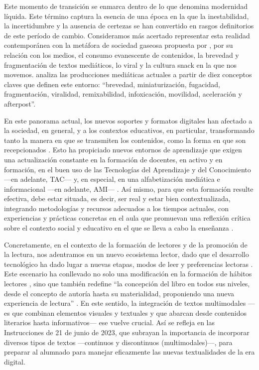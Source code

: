 \documentclass[spanish]{textolivre}
\begin{document}
Este momento de transición se enmarca dentro de lo que \textcite{bauman_modernidad_2004,bauman_acerca_2019} denomina modernidad líquida. Este término captura la esencia de una época en la que la inestabilidad, la incertidumbre y la ausencia de certezas se han convertido en rasgos definitorios de este período de cambio. Consideramos más acertado representar esta realidad contemporánea con la metáfora de sociedad gaseosa propuesta por \textcite{scolari_cultura_2021}, por su relación con los medios, el consumo evanescente de contenidos, la brevedad y fragmentación de textos mediáticos, lo viral y la cultura snack en la que nos movemos. \textcite[p. 157]{scolari_cultura_2021} analiza las producciones mediáticas actuales a partir de diez conceptos claves que definen este entorno: “brevedad, miniaturización, fugacidad, fragmentación, viralidad, remixabilidad, infoxicación, movilidad, aceleración y afterpost”.

En este panorama actual, los nuevos soportes y formatos digitales han afectado a la sociedad, en general, y a los contextos educativos, en particular, transformando tanto la manera en que se transmiten los contenidos, como la forma en que son recepcionados \cite{heredia_tecnicas_2019,tabernero_habitos_2020}. Esto ha propiciado nuevos entornos de aprendizaje que exigen una actualización constante en la formación de docentes, en activo y en formación, en el buen uso de las Tecnologías del Aprendizaje y del Conocimiento —en adelante, TAC— \cite{alvarez_tac_2017} y, en especial, en una alfabetización mediática e informacional —en adelante, AMI— \cite{santiago_del_pino_consulta_2019}. Así mismo, para que esta formación resulte efectiva, debe estar situada, es decir, ser real y estar bien contextualizada, integrando metodologías y recursos adecuados a los tiempos actuales, con experiencias y prácticas concretas en el aula que promuevan una reflexión crítica sobre el contexto social y educativo en el que se lleva a cabo la enseñanza \cite{imbernon_ser_2017,castaneda_quintero_formacion_2019,rovira-collado_intertextualidad_2021}.

Concretamente, en el contexto de la formación de lectores y de la promoción de la lectura, nos adentramos en un nuevo ecosistema lector, dado que el desarrollo tecnológico ha dado lugar a nuevas etapas, modos de leer y preferencias lectoras \cite{tabernero_habitos_2020}. Este escenario ha conllevado no solo una modificación en la formación de hábitos lectores \cite{tabernero_leer_2022b}, sino que también redefine “la concepción del libro en todos sus niveles, desde el concepto de autoría hasta su materialidad, proponiendo una nueva experiencia de lectura” \cite[p. 74]{samperiz_libro_2020}. En este sentido, la integración de textos multimodales —es que combinan elementos visuales y textuales y que abarcan desde contenidos literarios hasta informativos— ese vuelve crucial.  Así se refleja en las Instrucciones de 21 de junio de 2023, que subrayan la importancia de incorporar diversos tipos de textos —continuos y discontinuos (multimodales)—, para preparar al alumnado para manejar eficazmente las nuevas textualidades de la era digital.
\end{document}
